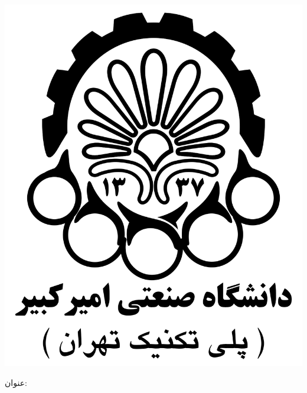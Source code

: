 
\begin{center}

\includegraphics[scale=0.15]{images/aut-fa.png}

\large\ThesisDepartment

\begin{large}
\vspace{0.5cm}



\end{large}

\vspace{1cm}


{\large\textbf{\ThesisClass}}
\vspace{0.5cm}

\ThesisSemester

\vspace{1.5cm}

{عنوان:}\\[1.2em]
{\LARGE\textbf{\ThesisTitle}}\\ 
\vspace{1cm}


\end{center}
